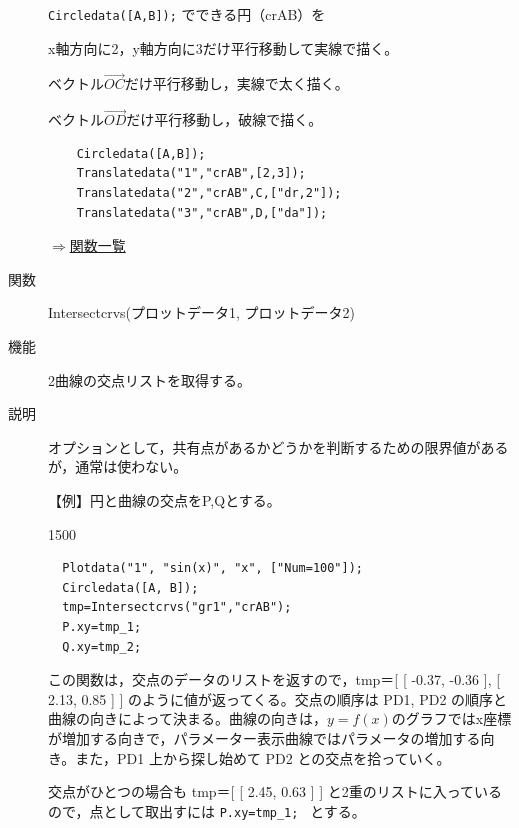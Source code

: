 \documentclass[papersize,a4paper,12pt,uplatex]{jsarticle}
\begin{document}
\begin{description}
    \verb|Circledata([A,B]);| でできる円（crAB）を
    
 x軸方向に2，y軸方向に3だけ平行移動して実線で描く。
    
ベクトル$\overrightarrow{OC} $だけ平行移動し，実線で太く描く。

ベクトル$\overrightarrow{OD} $だけ平行移動し，破線で描く。

\begin{verbatim}
    Circledata([A,B]);
    Translatedata("1","crAB",[2,3]);
    Translatedata("2","crAB",C,["dr,2"]);
    Translatedata("3","crAB",D,["da"]);
\end{verbatim}
\vspace{\baselineskip}
              \begin{center}  \end{center}


\begin{flushright}  \hyperlink{functionlist}{$\Rightarrow$関数一覧}\end{flushright}

\vspace{\baselineskip}
\hypertarget{intersectcrvs}{}
\item[関数]  Intersectcrvs(プロットデータ1, プロットデータ2)
\item[機能]  2曲線の交点リストを取得する。
\item[説明]  オプションとして，共有点があるかどうかを判断するための限界値があるが，通常は使わない。

\vspace{\baselineskip}
【例】円と曲線の交点をP,Qとする。

\begin{layer}{150}{0}
\end{layer}

\begin{verbatim}
  Plotdata("1", "sin(x)", "x", ["Num=100"]);
  Circledata([A, B]);
  tmp=Intersectcrvs("gr1","crAB");
  P.xy=tmp_1;
  Q.xy=tmp_2;
 \end{verbatim}

この関数は，交点のデータのリストを返すので，tmp＝[ [ -0.37, -0.36 ], [ 2.13, 0.85 ] ] のように値が返ってくる。交点の順序は PD1, PD2 の順序と曲線の向きによって決まる。曲線の向きは，$y=f(x)$のグラフではx座標が増加する向きで，パラメーター表示曲線ではパラメータの増加する向き。また，PD1 上から探し始めて PD2 との交点を拾っていく。

交点がひとつの場合も tmp＝[ [ 2.45, 0.63 ] ] と2重のリストに入っているので，点として取出すには \verb|P.xy=tmp_1; |  とする。


\end{description}
\end{document}
